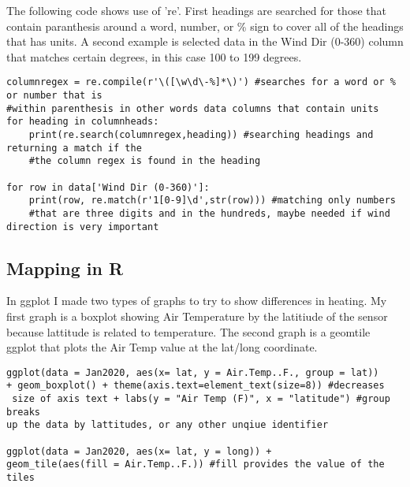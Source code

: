 \documentclass[letterpaper]{article}
\begin{document}
The following code shows use of 're'. First headings are searched for those that contain paranthesis around a word, number, or \% sign to cover all of the headings that has units. A second example is selected data in the Wind Dir (0-360) column that matches certain degrees, in this case 100 to 199 degrees.
\begin{lstlisting}
columnregex = re.compile(r'\([\w\d\-%]*\)') #searches for a word or % or number that is
#within parenthesis in other words data columns that contain units
for heading in columnheads:
    print(re.search(columnregex,heading)) #searching headings and returning a match if the
    #the column regex is found in the heading

for row in data['Wind Dir (0-360)']: 
    print(row, re.match(r'1[0-9]\d',str(row))) #matching only numbers 
    #that are three digits and in the hundreds, maybe needed if wind direction is very important 
\end{lstlisting}
\subsection{Mapping in R}
In ggplot I made two types of graphs to try to show differences in heating. My first graph is a boxplot showing Air Temperature by the latitiude of the sensor because lattitude is related to temperature. The second graph is a geomtile ggplot that plots the Air Temp value at the lat/long coordinate. 
\begin{lstlisting}
ggplot(data = Jan2020, aes(x= lat, y = Air.Temp..F., group = lat)) 
+ geom_boxplot() + theme(axis.text=element_text(size=8)) #decreases
 size of axis text + labs(y = "Air Temp (F)", x = "latitude") #group breaks 
up the data by lattitudes, or any other unqiue identifier 

ggplot(data = Jan2020, aes(x= lat, y = long)) + 
geom_tile(aes(fill = Air.Temp..F.)) #fill provides the value of the tiles
\end{lstlisting}
\end{document}
